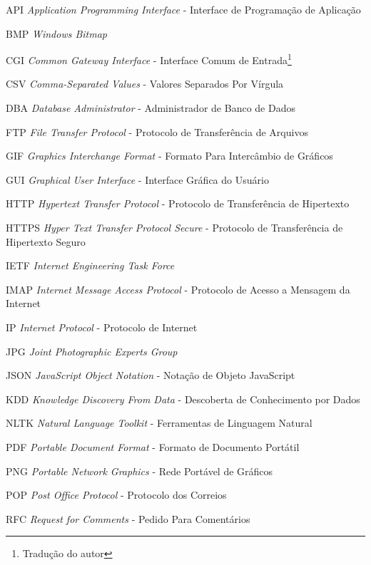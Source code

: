 \begin{siglas}
	\item[API] \textit{Application Programming Interface} - Interface de Programação de Aplicação
	\item[BMP] \textit{Windows Bitmap}
	\item[CGI] \textit{Common Gateway Interface} - Interface Comum de Entrada\footnote{Tradução do autor}
	\item[CSV] \textit{Comma-Separated Values} - Valores Separados Por Vírgula\footnotemark[1]
	\item[DBA] \textit{Database Administrator} - Administrador de Banco de Dados
	\item[FTP] \textit{File Transfer Protocol} - Protocolo de Transferência de Arquivos
	\item[GIF] \textit{Graphics Interchange Format} - Formato Para Intercâmbio de Gráficos\footnotemark[1]
	\item[GUI] \textit{Graphical User Interface} - Interface Gráfica do Usuário
	\item[HTTP] \textit{Hypertext Transfer Protocol} - Protocolo de Transferência de Hipertexto
	\item[HTTPS] \textit{Hyper Text Transfer Protocol Secure} - Protocolo de Transferência de Hipertexto Seguro
	\item[IETF] \textit{Internet Engineering Task Force}
	\item[IMAP] \textit{Internet Message Access Protocol} - Protocolo de Acesso a Mensagem da Internet
	\item[IP] \textit{Internet Protocol} - Protocolo de Internet
	\item[JPG] \textit{Joint Photographic Experts Group}
	\item[JSON] \textit{JavaScript Object Notation} - Notação de Objeto JavaScript\footnotemark[1] 
	\item[KDD] \textit{Knowledge Discovery From Data} - Descoberta de Conhecimento por Dados
	\item[NLTK] \textit{Natural Language Toolkit} - Ferramentas de Linguagem Natural\footnotemark[1]
	\item[PDF] \textit{Portable Document Format} - Formato de Documento Portátil\footnotemark[1]
	\item[PNG] \textit{Portable Network Graphics} - Rede Portável de Gráficos\footnotemark[1]
	\item[POP] \textit{Post Office Protocol} - Protocolo dos Correios
	\item[RFC] \textit{Request for Comments} - Pedido Para Comentários

\end{siglas}
